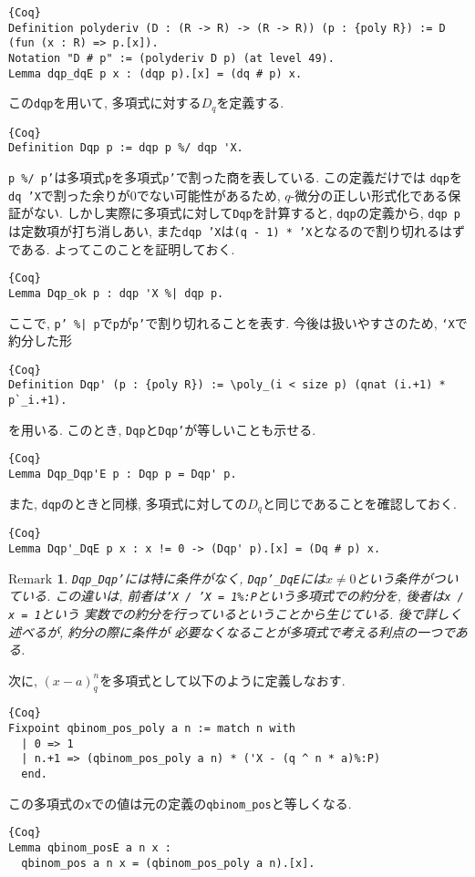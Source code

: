 \documentclass[11pt]{jarticle}
\theoremstyle{mystyle}
\newtheorem{rmk}[df]{$\textrm{Remark}$}
\newcommand{\brmk}{\begin{rmk}}
\newcommand{\ermk}{\end{rmk}}
\newcommand{\0}{\textbf{0}}
\newcommand{\1}{\textbf{1}}
\newcommand{\2}{\textbf{2}}
\begin{document}
\begin{lstlisting}{Coq}
Definition polyderiv (D : (R -> R) -> (R -> R)) (p : {poly R}) := D (fun (x : R) => p.[x]).
Notation "D # p" := (polyderiv D p) (at level 49).
Lemma dqp_dqE p x : (dqp p).[x] = (dq # p) x. \end{lstlisting}
この{\tt dqp}を用いて, 多項式に対する$D_q$を定義する. 
\begin{lstlisting}{Coq}
Definition Dqp p := dqp p %/ dqp 'X.
\end{lstlisting}
{\tt p \%/ p'}は多項式{\tt p}を多項式{\tt p'}で割った商を表している. この定義だけでは
{\tt dqp}を{\tt dq 'X}で割った余りが$0$でない可能性があるため, $q$-微分の正しい形式化である保証がない. しかし実際に多項式に対して{\tt Dqp}を計算すると, {\tt dqp}の定義から, {\tt dqp p}は定数項が打ち消しあい, また{\tt dqp 'X}は{\tt (q - 1) * 'X}となるので割り切れるはずである. 
よってこのことを証明しておく.  
\begin{lstlisting}{Coq}
Lemma Dqp_ok p : dqp 'X %| dqp p.
\end{lstlisting}
ここで, {\tt p' \%| p}で{\tt p}が{\tt p'}で割り切れることを表す. 
今後は扱いやすさのため, {\tt `X}で約分した形
\begin{lstlisting}{Coq}
Definition Dqp' (p : {poly R}) := \poly_(i < size p) (qnat (i.+1) * p`_i.+1).
\end{lstlisting}
を用いる. このとき, {\tt Dqp}と{\tt Dqp'}が等しいことも示せる. 
\begin{lstlisting}{Coq}
Lemma Dqp_Dqp'E p : Dqp p = Dqp' p. \end{lstlisting}
また, {\tt dqp}のときと同様, 多項式に対しての$D_q$と同じであることを確認しておく. 
\begin{lstlisting}{Coq}
Lemma Dqp'_DqE p x : x != 0 -> (Dqp' p).[x] = (Dq # p) x. \end{lstlisting}
\brmk
  {\tt Dqp\_Dqp'}には特に条件がなく, {\tt Dqp'\_DqE}には$x \neq 0$という条件がついている. 
  この違いは, 前者は{\tt 'X / 'X = 1\%:P}という多項式での約分を, 後者は{\tt x / x = 1}という
  実数での約分を行っているということから生じている. 後で詳しく述べるが, 約分の際に条件が
  必要なくなることが多項式で考える利点の一つである. 
\ermk
次に, $(x - a)^n_q$を多項式として以下のように定義しなおす. 
\begin{lstlisting}{Coq}
Fixpoint qbinom_pos_poly a n := match n with
  | 0 => 1
  | n.+1 => (qbinom_pos_poly a n) * ('X - (q ^ n * a)%:P)
  end. \end{lstlisting}
この多項式の{\tt x}での値は元の定義の{\tt qbinom\_pos}と等しくなる. 
\begin{lstlisting}{Coq}
Lemma qbinom_posE a n x :
  qbinom_pos a n x = (qbinom_pos_poly a n).[x].
\end{lstlisting}
\end{document}
